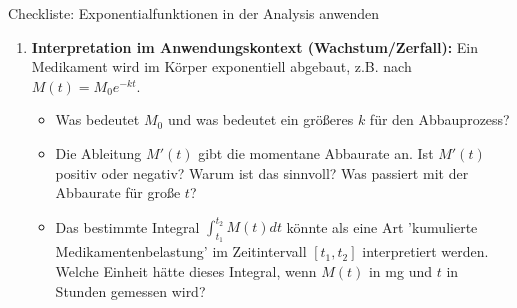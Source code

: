 \begin{aufgabenumgebung}{Checkliste: Exponentialfunktionen in der Analysis anwenden}
\begin{enumerate}[label=(\alph*)]
\begin{itemize}
    \end{itemize}
    \item \textbf{Interpretation im Anwendungskontext (Wachstum/Zerfall):}
    Ein Medikament wird im Körper exponentiell abgebaut, z.B. nach $M(t) = M_0 e^{-kt}$.
    \begin{itemize}
        \item Was bedeutet $M_0$ und was bedeutet ein größeres $k$ für den Abbauprozess?
        \item Die Ableitung $M'(t)$ gibt die momentane Abbaurate an. Ist $M'(t)$ positiv oder negativ? Warum ist das sinnvoll? Was passiert mit der Abbaurate für große $t$?
        \item Das bestimmte Integral $\int_{t_1}^{t_2} M(t) dt$ könnte als eine Art 'kumulierte Medikamentenbelastung' im Zeitintervall $[t_1, t_2]$ interpretiert werden. Welche Einheit hätte dieses Integral, wenn $M(t)$ in mg und $t$ in Stunden gemessen wird?
    \end{itemize}
\end{enumerate}
\end{aufgabenumgebung}




